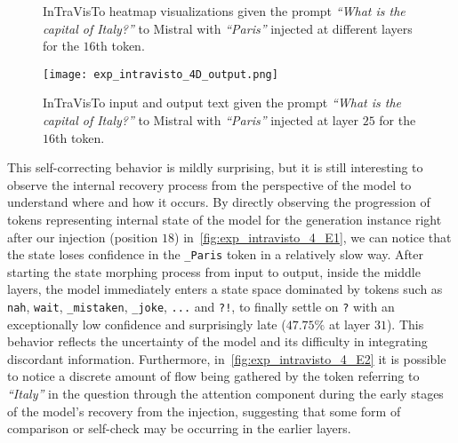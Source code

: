 \begin{figure}[tp!]
    \centering
    \quad
    \caption{InTraVisTo heatmap visualizations given the prompt \emph{``What is the capital of Italy?''} to Mistral with \emph{``Paris''} injected at different layers for the $16$th token.}
    \label{fig:exp_intravisto_4_D}
\end{figure}

\begin{figure}[tp!]
    \centering
    \texttt{[image: exp\_intravisto\_4D\_output.png]}
    \caption{InTraVisTo input and output text given the prompt \emph{``What is the capital of Italy?''} to Mistral with \emph{``Paris''} injected at layer $25$ for the $16$th token.}
    \label{fig:exp_intravisto_4_D3}
\end{figure}

This self-correcting behavior is mildly surprising, but it is still interesting to observe the internal recovery process from the perspective of the model to understand where and how it occurs.
By directly observing the progression of tokens representing internal state of the model for the generation instance right after our injection (position $18$) in~\cref{fig:exp_intravisto_4_E1}, we can notice that the state loses confidence in the \texttt{\_Paris} token in a relatively slow way.
After starting the state morphing process from input to output, inside the middle layers, the model immediately enters a state space dominated by tokens such as \texttt{nah}, \texttt{wait}, \texttt{\_mistaken}, \texttt{\_joke}, \texttt{...} and \texttt{?!}, to finally settle on \texttt{?} with an exceptionally low confidence and surprisingly late ($47.75\%$ at layer $31$). %
This behavior reflects the uncertainty of the model and its difficulty in integrating discordant information.
Furthermore, in~\cref{fig:exp_intravisto_4_E2} it is possible to notice a discrete amount of flow being gathered by the token referring to \emph{``Italy''} in the question through the attention component during the early stages of the model's recovery from the injection, suggesting that some form of comparison or self-check may be occurring in the earlier layers.


